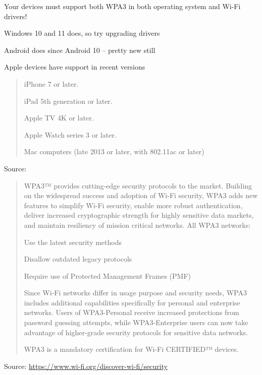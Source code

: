 \documentclass[Screen16to9,17pt]{foils}
\begin{document}
\begin{list2}
\item Your devices must support both WPA3 in both operating system and Wi-Fi drivers!
\item Windows 10 and 11 does, so try upgrading drivers
\item Android does since Android 10 -- pretty new still
\item Apple devices have support in recent versions
\end{list2}




\begin{quote}
\begin{list2}
\item iPhone 7 or later.
\item iPad 5th generation or later.
\item Apple TV 4K or later.
\item Apple Watch series 3 or later.
\item Mac computers (late 2013 or later, with 802.11ac or later)
\end{list2}
\end{quote}
Source: 




\begin{quote}

WPA3™ provides cutting-edge security protocols to the market. Building on the widespread success and adoption of Wi-Fi security, WPA3 adds new features to simplify Wi-Fi security, enable more robust authentication, deliver increased cryptographic strength for highly sensitive data markets, and maintain resiliency of mission critical networks. All WPA3 networks:

\begin{list2}
\item Use the latest security methods
\item Disallow outdated legacy protocols
\item Require use of Protected Management Frames (PMF)
\end{list2}
Since Wi-Fi networks differ in usage purpose and security needs, WPA3 includes additional capabilities specifically for personal and enterprise networks. Users of WPA3-Personal receive increased protections from password guessing attempts, while WPA3-Enterprise users can now take advantage of higher-grade security protocols for sensitive data networks.

WPA3 is a mandatory certification for Wi-Fi CERTIFIED™ devices.
\end{quote}
Source: \url{https://www.wi-fi.org/discover-wi-fi/security}
\end{document}
